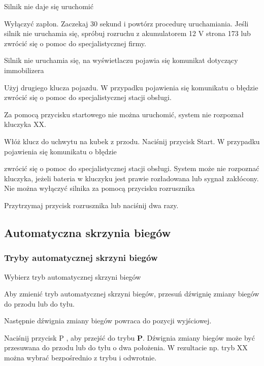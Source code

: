 Silnik nie daje się uruchomić
\begin{itemizeArrow}
	\itemArrow Wyłączyć zapłon.
	\itemArrow Zaczekaj 30 sekund i powtórz procedurę uruchamiania.
	\itemArrow Jeśli silnik nie uruchamia się, spróbuj rozruchu z akumulatorem 12 V \guillemotright strona 173 lub zwrócić się o pomoc do specjalistycznej firmy.
\end{itemizeArrow}

Silnik nie uruchamia się, na wyświetlaczu pojawia się komunikat dotyczący immobilizera
\begin{itemizeArrow}
	\itemArrow Użyj drugiego klucza pojazdu.
	\itemArrow W przypadku pojawienia się komunikatu o błędzie zwrócić się o pomoc do specjalistycznej stacji obsługi.
\end{itemizeArrow}

Za pomocą przycisku startowego nie można uruchomić, system nie rozpoznał kluczyka XX.

\begin{itemizeArrow}
	\itemArrow Włóż klucz do uchwytu na kubek z przodu.
	\itemArrow Naciśnij przycisk Start.
	\itemArrow W przypadku pojawienia się komunikatu o błędzie
\end{itemizeArrow}
zwrócić się o pomoc do specjalistycznej stacji obsługi.
System może nie rozpoznać kluczyka, jeżeli bateria w kluczyku jest prawie rozładowana lub sygnał zakłócony.
Nie można wyłączyć silnika za pomocą przycisku rozrusznika
\begin{itemizeArrow}
	\itemArrow Przytrzymaj przycisk rozrusznika lub naciśnij dwa razy.
\end{itemizeArrow}

\subsection{Automatyczna skrzynia biegów}

\subsubsection{Tryby automatycznej skrzyni biegów}

\newcommand{\gearFmt}{\textbf}
\newcommand{\gearP}{\gearFmt{P}}
\newcommand{\gearR}{\gearFmt{R}}
\newcommand{\gearN}{\gearFmt{N}}
\newcommand{\gearDS}{\gearFmt{D/S}}
\newcommand{\gearD}{\gearFmt{D}}
\newcommand{\gearS}{\gearFmt{S}}

Wybierz tryb automatycznej skrzyni biegów
\begin{itemizeArrow}
	\itemArrow Aby zmienić tryb automatycznej skrzyni biegów, przesuń dźwignię zmiany biegów do przodu lub do tyłu.
\end{itemizeArrow}
Następnie dźwignia zmiany biegów powraca do pozycji wyjściowej.
\begin{itemizeArrow}
	\itemArrow Naciśnij przycisk P , aby przejść do trybu \gearP. Dźwignia zmiany biegów może być przesuwana do przodu lub do tyłu o dwa położenia. W rezultacie np. tryb XX można wybrać bezpośrednio z trybu i odwrotnie.
\end{itemizeArrow}

